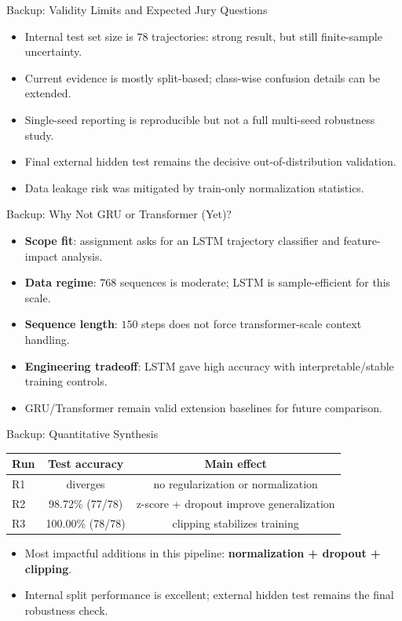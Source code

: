 \begin{frame}{Backup: Validity Limits and Expected Jury Questions}
\small
\begin{itemize}[<+->]
  \item Internal test set size is \(78\) trajectories: strong result, but still finite-sample uncertainty.
  \item Current evidence is mostly split-based; class-wise confusion details can be extended.
  \item Single-seed reporting is reproducible but not a full multi-seed robustness study.
  \item Final external hidden test remains the decisive out-of-distribution validation.
  \item Data leakage risk was mitigated by train-only normalization statistics.
\end{itemize}
\end{frame}

\begin{frame}{Backup: Why Not GRU or Transformer (Yet)?}
\small
\begin{itemize}[<+->]
  \item \textbf{Scope fit}: assignment asks for an LSTM trajectory classifier and feature-impact analysis.
  \item \textbf{Data regime}: \(768\) sequences is moderate; LSTM is sample-efficient for this scale.
  \item \textbf{Sequence length}: \(150\) steps does not force transformer-scale context handling.
  \item \textbf{Engineering tradeoff}: LSTM gave high accuracy with interpretable/stable training controls.
  \item GRU/Transformer remain valid extension baselines for future comparison.
\end{itemize}
\end{frame}

\begin{frame}{Backup: Quantitative Synthesis}
\small
\begin{tabular}{lcc}
\toprule
\textbf{Run} & \textbf{Test accuracy} & \textbf{Main effect} \\
\midrule
R1 & diverges & no regularization or normalization \\
R2 & 98.72\% (77/78) & z-score + dropout improve generalization \\
R3 & 100.00\% (78/78) & clipping stabilizes training \\
\bottomrule
\end{tabular}
\vspace{0.5em}
\small
\begin{itemize}[<+->]
  \item Most impactful additions in this pipeline: \textbf{normalization + dropout + clipping}.
  \item Internal split performance is excellent; external hidden test remains the final robustness check.
\end{itemize}
\end{frame}

